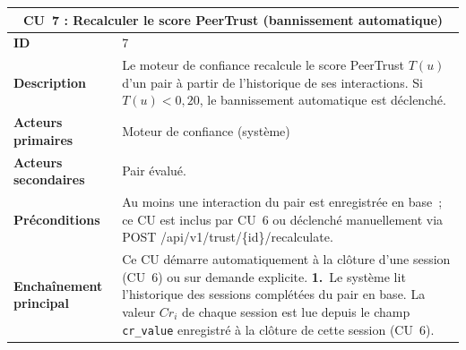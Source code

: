 \begin{table}[H]
\centering
\renewcommand{\arraystretch}{1.5}
\begin{tabular}{|p{3.5cm}|p{10.5cm}|}
\hline
\multicolumn{2}{|c|}{\textbf{CU~7 : Recalculer le score PeerTrust (bannissement automatique)}} \\
\hline
\textbf{ID} & 7 \\
\hline
\textbf{Description} & Le moteur de confiance recalcule le score PeerTrust $T(u)$ d'un pair à partir de l'historique de ses interactions. Si $T(u) < 0{,}20$, le bannissement automatique est déclenché. \\
\hline
\textbf{Acteurs primaires} & Moteur de confiance (système) \\
\hline
\textbf{Acteurs secondaires} & Pair évalué. \\
\hline
\textbf{Préconditions} & Au moins une interaction du pair est enregistrée en base~; ce CU est inclus par CU~6 ou déclenché manuellement via {POST /api/v1/trust/\{id\}/recalculate}. \\
\hline
\textbf{Enchaînement principal} &
Ce CU démarre automatiquement à la clôture d'une session (CU~6) ou sur demande explicite.\newline
\textbf{1.}\ Le système lit l'historique des sessions complétées du pair en base.
La valeur $Cr_i$ de chaque session est lue depuis le champ \texttt{cr\_value}
enregistré à la clôture de cette session (CU~6).\newline


\end{tabular}
\end{table}
